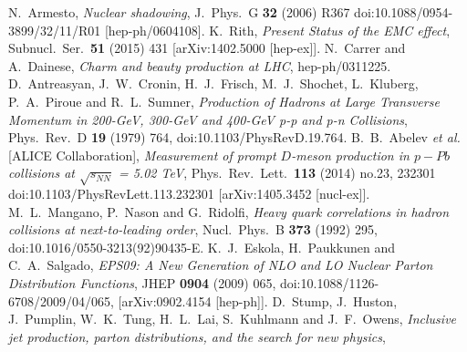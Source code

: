 \documentclass[b5paper,10pt,twoside,oldstyle,classica]{toptesi}
\begin{document}
\begin{thebibliography}{10}
   N.~Armesto,
   \textit{Nuclear shadowing},
   J.\ Phys.\ G {\bf 32} (2006) R367
   doi:10.1088/0954-3899/32/11/R01
   [hep-ph/0604108].
  K.~Rith,
  \textit{Present Status of the EMC effect},
  Subnucl.\ Ser.\  {\bf 51} (2015) 431
  [arXiv:1402.5000 [hep-ex]].
  N.~Carrer and A.~Dainese,
  \textit{Charm and beauty production at LHC},
  hep-ph/0311225.
  D.~Antreasyan, J.~W.~Cronin, H.~J.~Frisch, M.~J.~Shochet, L.~Kluberg, P.~A.~Piroue and R.~L.~Sumner,
  \textit{Production of Hadrons at Large Transverse Momentum in 200-GeV, 300-GeV and 400-GeV p-p and p-n Collisions},
  Phys.\ Rev.\ D {\bf 19} (1979) 764,
  doi:10.1103/PhysRevD.19.764.
  B.~B.~Abelev {\it et al.} [ALICE Collaboration],
  \textit{Measurement of prompt $D$-meson production in $p-Pb$ collisions at $\sqrt{s_{NN}}$ = 5.02 TeV},
  Phys.\ Rev.\ Lett.\  {\bf 113} (2014) no.23,  232301
  doi:10.1103/PhysRevLett.113.232301
  [arXiv:1405.3452 [nucl-ex]].
  M.~L.~Mangano, P.~Nason and G.~Ridolfi,
  \textit{Heavy quark correlations in hadron collisions at next-to-leading order},
  Nucl.\ Phys.\ B {\bf 373} (1992) 295,
  doi:10.1016/0550-3213(92)90435-E.
  K.~J.~Eskola, H.~Paukkunen and C.~A.~Salgado,
  \textit{EPS09: A New Generation of NLO and LO Nuclear Parton Distribution Functions},
  JHEP {\bf 0904} (2009) 065,
  doi:10.1088/1126-6708/2009/04/065,
  [arXiv:0902.4154 [hep-ph]].
  D.~Stump, J.~Huston, J.~Pumplin, W.~K.~Tung, H.~L.~Lai, S.~Kuhlmann and J.~F.~Owens,
  \textit{Inclusive jet production, parton distributions, and the search for new physics},

\end{thebibliography}
\end{document}
